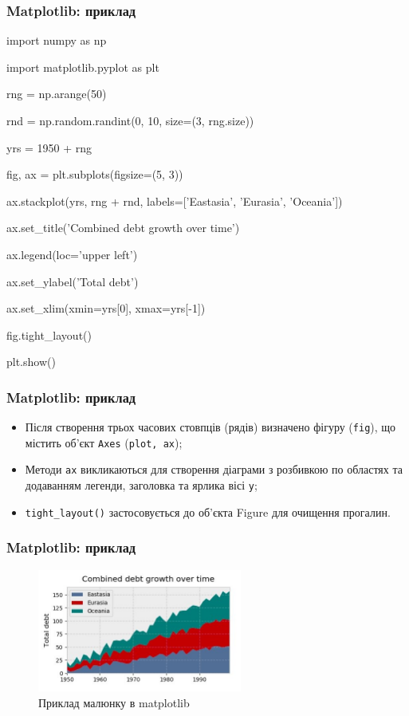\begin{frame}
\frametitle{Matplotlib: приклад}
\scriptsize
import numpy as np

import matplotlib.pyplot as plt

rng = np.arange(50)

rnd = np.random.randint(0, 10, size=(3, rng.size))

yrs = 1950 + rng

fig, ax = plt.subplots(figsize=(5, 3))

ax.stackplot(yrs, rng + rnd, labels=['Eastasia', 'Eurasia', 'Oceania'])

ax.set\_title('Combined debt growth over time')

ax.legend(loc='upper left')

ax.set\_ylabel('Total debt')

ax.set\_xlim(xmin=yrs[0], xmax=yrs[-1])

fig.tight\_layout()

plt.show()
\normalsize
\end{frame}

\begin{frame}
\frametitle{Matplotlib: приклад}
\begin{itemize}
  \item Після створення трьох часових стовпців (рядів) визначено фігуру (\texttt{fig}), що містить об'єкт \texttt{Axes} (\texttt{plot, ax});
  \item Методи \texttt{ax} викликаються для створення діаграми з розбивкою по областях та додаванням легенди, заголовка та ярлика вісі \texttt{y};
  \item \texttt{tight\_layout()} застосовується до об'єкта Figure для очищення прогалин.
\end{itemize}
\end{frame}

\begin{frame}
\frametitle{Matplotlib: приклад}

\begin{figure}
  \begin{center}
    \includegraphics[width=0.6\textwidth,height=0.6\textheight]{pictures/example-matplotlib.jpg}
  \caption{Приклад малюнку в matplotlib}
\label{function}
  \end{center}
\end{figure}
\end{frame}
